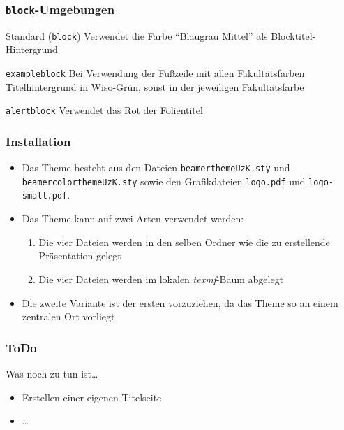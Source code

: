 \documentclass{beamer}
\begin{document}
\begin{frame}
  \frametitle{\texttt{block}-Umgebungen}
  \begin{block}{Standard (\texttt{block})}
    Verwendet die Farbe "`Blaugrau Mittel"' als Blocktitel-Hintergrund
  \end{block}

  \begin{exampleblock}{\texttt{exampleblock}}
    Bei Verwendung der Fußzeile mit allen Fakultätsfarben
    Titelhintergrund in Wiso-Grün, sonst in der jeweiligen
    Fakultätsfarbe
  \end{exampleblock}

  \begin{alertblock}{\texttt{alertblock}}
    Verwendet das Rot der Folientitel
  \end{alertblock}

\end{frame}


\begin{frame}
  \frametitle{Installation}
  \begin{itemize}
  \item Das Theme besteht aus den Dateien
    \texttt{beamerthemeUzK.sty} und \texttt{beamercolorthemeUzK.sty}
    sowie den Grafikdateien \texttt{logo.pdf} und
    \texttt{logo-small.pdf}.
  \item Das Theme kann auf zwei Arten verwendet werden:
    \begin{enumerate}
    \item Die vier Dateien werden in den selben Ordner wie die zu
      erstellende Präsentation gelegt
    \item Die vier Dateien werden im lokalen \emph{texmf}-Baum abgelegt
    \end{enumerate}
  \item Die zweite Variante ist der ersten vorzuziehen, da das Theme
    so an einem zentralen Ort vorliegt
  \end{itemize}
\end{frame}


\begin{frame}
  \frametitle{ToDo}

  \begin{block}{Was noch zu tun ist\ldots}
    \begin{itemize}
    \item Erstellen einer eigenen Titelseite
    \item \ldots
    \end{itemize}
  \end{block}

\end{frame}
\end{document}
